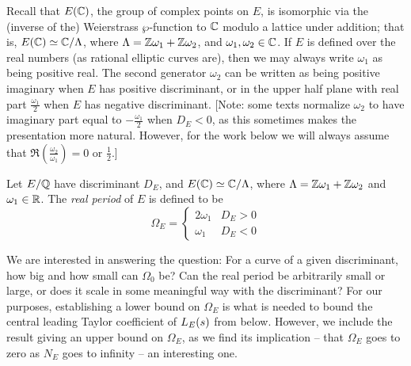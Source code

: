 Recall that $E(\mathbb{C})$, the group of complex points on $E$, is isomorphic via the (inverse of the) Weierstrass $\wp$-function to $\mathbb{C}$ modulo a lattice under addition; that is, $E(\mathbb{C}) \simeq \mathbb{C}/\Lambda$, where $\Lambda = \mathbb{Z}\omega_1 + \mathbb{Z}\omega_2$, and $\omega_1,\omega_2 \in \mathbb{C}$.
If $E$ is defined over the real numbers (as rational elliptic curves are), then we may always write $\omega_1$ as being positive real. The second generator $\omega_2$ can be written as being positive imaginary when $E$ has positive discriminant, or in the upper half plane with real part $\frac{\omega_1}{2}$ when $E$ has negative discriminant. [Note: some texts normalize $\omega_2$ to have imaginary part equal to $-\frac{\omega_1}{2}$ when $D_E<0$, as this sometimes makes the presentation more natural. However, for the work below we will always assume that $\Re(\frac{\omega_2}{\omega_1}) = 0$ or $\frac{1}{2}$.]

\begin{definition}\label{defn:real_period}
Let $E/\mathbb{Q}$ have discriminant $D_E$, and $E(\mathbb{C}) \simeq \mathbb{C}/\Lambda$, where $\Lambda = \mathbb{Z}\omega_1 + \mathbb{Z}\omega_2$ and $\omega_1 \in \mathbb{R}$. The {\it real period} of $E$ is defined to be
\begin{equation}
\Omega_E = \begin{cases} 2\omega_1 & D_E > 0 \\ \omega_1 & D_E < 0 \end{cases}
\end{equation}
\end{definition}

We are interested in answering the question: For a curve of a given discriminant, how big and how small can $\Omega_0$ be? Can the real period be arbitrarily small or large, or does it scale in some meaningful way with the discriminant? For our purposes, establishing a lower bound on $\Omega_E$ is what is needed to bound the central leading Taylor coefficient of $L_E(s)$ from below. However, we include the result giving an upper bound on $\Omega_E$, as we find its implication -- that $\Omega_E$ goes to zero as $N_E$ goes to infinity -- an interesting one. \\

